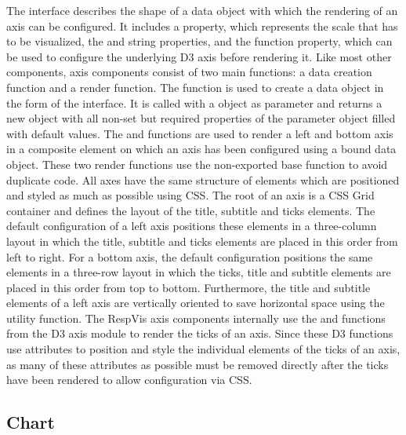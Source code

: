 The  interface describes the shape of a data object with which the rendering of an axis can be configured.
It includes a  property, which represents the scale that has to be visualized, the  and  string properties, and the  function property, which can be used to configure the underlying D3 axis before rendering it.  
Like most other components, axis components consist of two main functions: a data creation function and a render function.
The  function is used to create a data object in the form of the  interface.
It is called with a  object as parameter and returns a new object with all non-set but required properties of the parameter object filled with default values.
The  and  functions are used to render a left and bottom axis in a composite element on which an axis has been configured using a bound  data object. 
These two render functions use the non-exported  base function to avoid duplicate code.
All axes have the same structure of elements which are positioned and styled as much as possible using CSS.
The root of an axis is a CSS Grid container and defines the layout of the title, subtitle and ticks elements.
The default configuration of a left axis positions these elements in a three-column layout in which the title, subtitle and ticks elements are placed in this order from left to right.
For a bottom axis, the default configuration positions the same elements in a three-row layout in which the ticks, title and subtitle elements are placed in this order from top to bottom.
Furthermore, the title and subtitle elements of a left axis are vertically oriented to save horizontal space using the  utility function.
The RespVis axis components internally use the  and  functions from the D3 axis module \parencite{D3Axis} to render the ticks of an axis.
Since these D3 functions use attributes to position and style the individual elements of the ticks of an axis, as many of these attributes as possible must be removed directly after the ticks have been rendered to allow configuration via CSS. 

\subsection{Chart}

